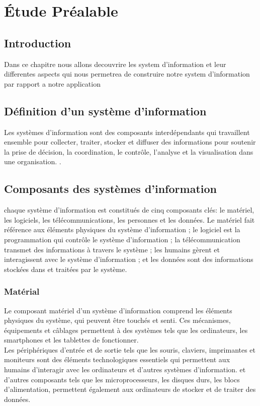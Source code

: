 \chapter{Étude Préalable }
\section{Introduction }

\par Dans ce chapitre nous allons decouvrire les system d'information et leur differentes aspects qui nous permetrea de construire notre system d'information par rapport a notre application


\section{Définition d'un système d'information }
\par Les systèmes d'information sont des composants interdépendants qui travaillent ensemble pour collecter, traiter, stocker et diffuser des informations pour soutenir la prise de décision, la coordination, le contrôle, l'analyse et la visualisation dans une organisation.
\cite{ref1}.

\section{Composants des systèmes d'information }
\par chaque système d'information est constitués de cinq composants clés: le matériel, les logiciels, les télécommunications, les personnes et les données. Le matériel fait référence aux éléments physiques du système d'information ; le logiciel est la programmation qui contrôle le système d'information ; la télécommunication transmet des informations à travers le système ; les humains gèrent et interagissent avec le système d'information ; et les données sont des informations stockées dans et traitées par le système.

\subsection{Matérial }
\par Le composant matériel d'un système d'information comprend les éléments physiques du système, qui peuvent être touchés et senti. Ces mécanismes, équipements et câblages permettent à des systèmes tels que les ordinateurs, les smartphones et les tablettes de fonctionner.\\
Les périphériques d'entrée et de sortie tels que les souris, claviers, imprimantes et moniteurs sont des éléments technologiques essentiels qui permettent aux humains d'interagir avec les ordinateurs et d'autres systèmes d'information. et d’autres composants tels que les microprocesseurs, les disques durs, les blocs d'alimentation, permettent également aux ordinateurs de stocker et de traiter des données.
     
